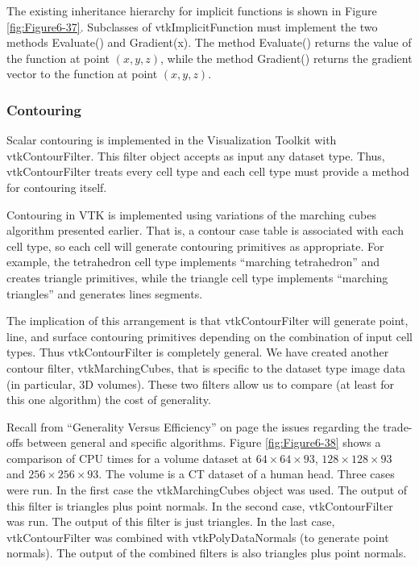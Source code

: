 The existing inheritance hierarchy for implicit functions is shown in Figure \ref{fig:Figure6-37}. Subclasses of vtkImplicitFunction must implement the two methods Evaluate() and Gradient(x). The method Evaluate() returns the value of the function at point $(x,y,z)$, while the method Gradient() returns the gradient vector to the function at point $(x,y,z)$.

\subsubsection{Contouring}

Scalar contouring is implemented in the Visualization Toolkit with vtkContourFilter. This filter object accepts as input any dataset type. Thus, vtkContourFilter treats every cell type and each cell type must provide a method for contouring itself.

Contouring in VTK is implemented using variations of the marching cubes algorithm presented earlier. That is, a contour case table is associated with each cell type, so each cell will generate contouring primitives as appropriate. For example, the tetrahedron cell type implements ``marching tetrahedron'' and creates triangle primitives, while the triangle cell type implements ``marching triangles'' and generates lines segments.

The implication of this arrangement is that vtkContourFilter will generate point, line, and surface contouring primitives depending on the combination of input cell types. Thus vtkContourFilter is completely general. We have created another contour filter, vtkMarchingCubes, that is specific to the dataset type image data (in particular, 3D volumes). These two filters allow us to compare (at least for this one algorithm) the cost of generality.

Recall from ``Generality Versus Efficiency'' on page \pageref{subsec:benerality_vs_efficiency} the issues regarding the trade-offs between general and specific algorithms. Figure \ref{fig:Figure6-38} shows a comparison of CPU times for a volume dataset at $64 \times 64\times 93$, $128 \times 128\times 93$ and $256 \times 256\times 93$. The volume is a CT dataset of a human head. Three cases were run. In the first case the  vtkMarchingCubes object was used. The output of this filter is triangles plus point normals. In the second case, vtkContourFilter was run. The output of this filter is just triangles. In the last case, vtkContourFilter was combined with vtkPolyDataNormals (to generate point normals). The output of the combined filters is also triangles plus point normals.

